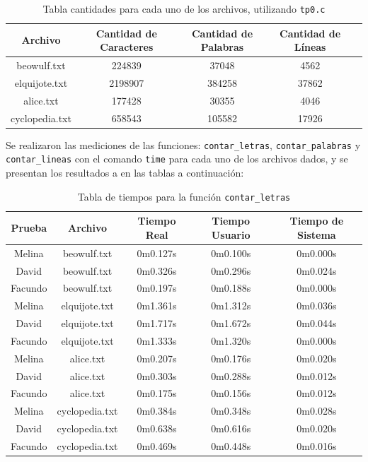 \documentclass[a4paper, 10pt, twoside, notitlepage]{article}
\begin{document}
\begin{table}[H]
    \centering
    \begin{tabular}{|c|c|c|c|c|}
        \hline
          Archivo & Cantidad de Caracteres & Cantidad de Palabras & Cantidad de Líneas   \\ \hline
          beowulf.txt & 224839 & 37048 & 4562 \\ \hline
          elquijote.txt & 2198907 & 384258 & 37862 \\ \hline
          alice.txt & 177428 & 30355 & 4046 \\ \hline
          cyclopedia.txt & 658543 & 105582 & 17926 \\ \hline
    \end{tabular}
    \caption{Tabla cantidades para cada uno de los archivos, utilizando \texttt{tp0.c}}
    \label{tab:cantidades}
\end{table}

Se realizaron las mediciones de las funciones: \texttt{contar\_letras}, \texttt{contar\_palabras} y \texttt{contar\_lineas} con el comando \texttt{time} para cada uno de los archivos dados, y se presentan los resultados a en las tablas a continuación:


\begin{table}[H]
    \centering
    \begin{tabular}{|c|c|c|c|c|}
        \hline
         Prueba & Archivo & Tiempo Real & Tiempo Usuario & Tiempo de Sistema   \\ \hline
         Melina & beowulf.txt & 0m0.127s & 0m0.100s & 0m0.000s \\ \hline
         David & beowulf.txt & 0m0.326s & 0m0.296s & 0m0.024s \\ \hline
         Facundo & beowulf.txt & 0m0.197s & 0m0.188s & 0m0.000s \\ \hline
         Melina & elquijote.txt & 0m1.361s & 0m1.312s & 0m0.036s \\ \hline
         David & elquijote.txt & 0m1.717s & 0m1.672s & 0m0.044s \\ \hline
         Facundo & elquijote.txt & 0m1.333s & 0m1.320s & 0m0.000s \\ \hline
         Melina & alice.txt & 0m0.207s & 0m0.176s & 0m0.020s \\ \hline
         David & alice.txt & 0m0.303s & 0m0.288s & 0m0.012s \\ \hline
         Facundo & alice.txt & 0m0.175s & 0m0.156s & 0m0.012s \\ \hline
         Melina & cyclopedia.txt & 0m0.384s & 0m0.348s & 0m0.028s \\ \hline
         David & cyclopedia.txt & 0m0.638s & 0m0.616s & 0m0.020s \\ \hline
         Facundo & cyclopedia.txt & 0m0.469s & 0m0.448s & 0m0.016s \\ \hline
         
    \end{tabular}
    \caption{Tabla de tiempos para la función \texttt{contar\_letras}}
    \label{tab:contar_letras}
\end{table}
\end{document}
